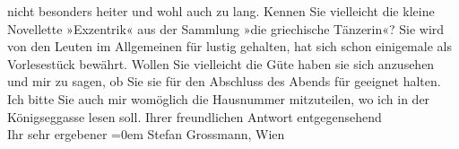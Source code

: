 \begin{ledgroupsized}[t]{13cm}
                    nicht besonders heiter und wohl auch zu lang.\pend
           \pstart
           Kennen Sie vielleicht die kleine Novellette »Exzentrik« aus der Sammlung »die
                        griechische Tänzerin«? Sie wird von den Leuten im Allgemeinen für
                    lustig gehalten, hat sich schon einigemale als Vorlesestück bewährt. Wollen Sie
                    vielleicht die Güte haben sie sich anzusehen und mir zu sagen, ob Sie sie für
                    den Abschluss des Abends für geeignet halten.\pend
           \pstart
           Ich bitte Sie auch mir womöglich die Hausnummer mitzuteilen, wo ich in der Königseggasse lesen soll.\pend
           \pstart
           Ihrer freundlichen Antwort entgegensehend{\\[\baselineskip]}Ihr sehr ergebener\pend
           \leftskip=0em{}{\bigskip}\pstart
           \noindent{}\label{T_L01718_1v}\label{T_L01718_1h}
                        Stefan Grossmann, Wien\pend
           
         
         \endnumbering{}\end{ledgroupsized}  \newcommand{\dateiname}{L01718}\newcommand{\titel}{Arthur Schnitzler an Stefan Großmann, 9. 10. 1907}\newcommand{\editorInnen}{Martin Anton Müller und Gerd-Hermann Susen}
      